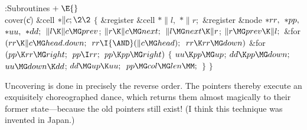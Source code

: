 \Y\B\4:Subroutines\X${}\mathrel+\E{}$\6
\\{cover}(\|c)\1\1\6
\&{cell} ${}{*}\|c;\2\2{}$\6
${}\{{}$\5
\1\&{register} \&{cell} ${}{*}\|l,{}$ ${}{*}\|r;{}$\6
\&{register} \&{node} ${}{*}\\{rr},{}$ ${}{*}\\{pp},{}$ ${}{*}\\{uu},{}$ ${}{*}%
\\{dd};{}$\7
${}\|l\K\|c\MG\\{prev}{}$;\5
${}\|r\K\|c\MG\\{next};{}$\6
${}\|l\MG\\{next}\K\|r{}$;\5
${}\|r\MG\\{prev}\K\|l;{}$\6
\&{for} ${}(\\{rr}\K\|c\MG\\{head}.\\{down};{}$ ${}\\{rr}\I{\AND}(\|c\MG%
\\{head});{}$ ${}\\{rr}\K\\{rr}\MG\\{down}){}$\1\6
\&{for} ${}(\\{pp}\K\\{rr}\MG\\{right};{}$ ${}\\{pp}\I\\{rr};{}$ ${}\\{pp}\K%
\\{pp}\MG\\{right}){}$\5
${}\{{}$\1\6
${}\\{uu}\K\\{pp}\MG\\{up}{}$;\5
${}\\{dd}\K\\{pp}\MG\\{down};{}$\6
${}\\{uu}\MG\\{down}\K\\{dd}{}$;\5
${}\\{dd}\MG\\{up}\K\\{uu};{}$\6
${}\\{pp}\MG\\{col}\MG\\{len}\MM;{}$\6
\4${}\}{}$\2\2\6
\4${}\}{}$\2\par
\fi

Uncovering is done in precisely the reverse order. The
pointers thereby
execute an exquisitely choreo\-graphed dance, which returns them almost
magically to their former state---because the old pointers still exist!
(I think this technique was invented in Japan.)

